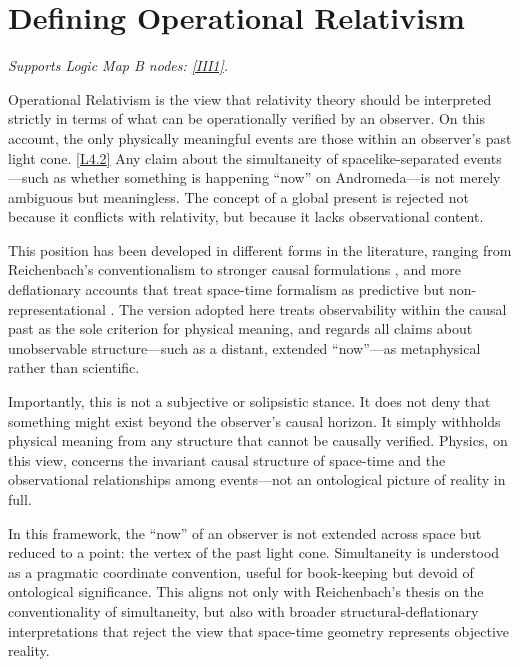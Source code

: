 \documentclass[12pt]{book}
\newcounter{logicanchor}
\newenvironment{logicanchorenv}[1]{\refstepcounter{logicanchor}\label{#1}}{}
\newcommand{\logiclink}[2]{\begin{logicanchorenv}{logic:#1}\end{logicanchorenv}\hyperref[appendix:#1]{[#1]}\xspace}
\begin{document}
\section{Defining Operational Relativism}\label{sec:4.1}
\noindent\textit{Supports Logic Map B nodes: \hyperref[appendix:III1]{[III1]}.}

\vspace{4pt}

Operational Relativism is the view that relativity theory should be interpreted strictly in terms of what can be operationally verified by an observer. On this account, the only physically meaningful events are those within an observer's past light cone. \logiclink{L4.2}{} Any claim about the simultaneity of spacelike-separated events---such as whether something is happening ``now'' on Andromeda---is not merely ambiguous but meaningless. The concept of a global present is rejected not because it conflicts with relativity, but because it lacks observational content.

This position has been developed in different forms in the literature, ranging from Reichenbach's conventionalism \citep{reichenbach1958} to stronger causal formulations \citep{Salmon1969, Malament1977}, and more deflationary accounts that treat space-time formalism as predictive but non-representational \citep{vanFraassen1980, Earman1989, Brown2005}. The version adopted here treats observability within the causal past as the sole criterion for physical meaning, and regards all claims about unobservable structure---such as a distant, extended ``now''---as metaphysical rather than scientific.

Importantly, this is not a subjective or solipsistic stance. It does not deny that something might exist beyond the observer's causal horizon. It simply withholds physical meaning from any structure that cannot be causally verified. Physics, on this view, concerns the invariant causal structure of space-time and the observational relationships among events---not an ontological picture of reality in full.

In this framework, the ``now'' of an observer is not extended across space but reduced to a point: the vertex of the past light cone. Simultaneity is understood as a pragmatic coordinate convention, useful for book-keeping but devoid of ontological significance. This aligns not only with Reichenbach's thesis on the conventionality of simultaneity, but also with broader structural-deflationary interpretations that reject the view that space-time geometry represents objective reality.
\end{document}

